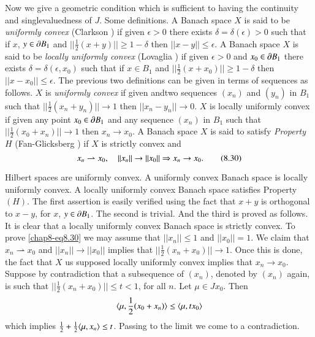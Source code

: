 \begin{remark*}
Now we give a geometric condition which is sufficient to having the
continuity and singlevaluedness of $J$. Some definitions. A Banach
space $X$ is said to be {\em uniformly convex} (Clarkson \cite{key26})
if given $\epsilon>0$ there exists $\delta=\delta(\epsilon)>0$ such
that if $x$, $y\in \partial B_{1}$ and $||\frac{1}{2}(x+y)||\geq 1-\delta$
then $||x-y||\leq \epsilon$. A Banach space $X$ is said to be {\em
  locally uniformly convex} (Lovaglia \cite{key58}) if given
$\epsilon>0$ and $x_{0}\in\partial B_{1}$ there exists
$\delta=\delta(\epsilon,x_{0})$ such that if $x\in B_{1}$ and
$||\frac{1}{2}(x+x_{0})||\geq 1-\delta$ then $||x-x_{0}||\leq
\epsilon$. The previous two definitions can be given in terms of
sequences as follows. $X$ is {\em uniformly convex} if given
and\pageoriginale two sequences $(x_{n})$ and $(y_{n})$ in $B_{1}$
such that $||\frac{1}{2}(x_{n}+y_{n})||\to 1$ then $||x_{n}-y_{n}||\to
0$. $X$ is locally uniformly convex if given any point $x_{0}\in \partial
B_{1}$ and any sequence $(x_{n})$ in $B_{1}$ such that
$||\frac{1}{2}(x_{0}+x_{n})||\to 1$ then $x_{n}\to x_{0}$. A Banach
space $X$ is said to satisfy {\em Property} $H$ (Fan-Glicksberg
\cite{key40}) if $X$ is strictly convex and
\begin{equation*}
x_{n}\rightharpoonup x_{0},\quad ||x_{n}||\to ||x_{0}||\Rightarrow
x_{n}\to x_{0}.\tag{8.30}\label{chap8-eq8.30} 
\end{equation*}

Hilbert spaces are uniformly convex. A uniformly convex Banach space
is locally uniformly convex. A locally uniformly convex Banach space
satisfies Property $(H)$. The first assertion is easily verified using
the fact that $x+y$ is orthogonal to $x-y$, for $x$, $y\in \partial
B_{1}$. The second is trivial. And the third is proved as follows. It
is clear that a locally uniformly convex Banach space is strictly
convex. To prove \eqref{chap8-eq8.30} we may assume that
$||x_{n}||\leq 1$ and $||x_{0}||=1$. We claim that
$x_{n}\rightharpoonup x_{0}$ and $||x_{n}||\to ||x_{0}||$ implies that
$||\frac{1}{2}(x_{n}+x_{0})||\to 1$. Once this is done, the fact that
$X$ us supposed locally uniformly convex implies that $x_{n}\to
x_{0}$. Suppose by contradiction that a subsequence of $(x_{n})$,
denoted by $(x_{n})$ again, is such that
$||\frac{1}{2}(x_{n}+x_{0})||\leq t<1$, for all $n$. Let $\mu\in
Jx_{0}$. Then
$$
\langle \mu,\frac{1}{2}(x_{0}+x_{n})\rangle \leq \langle \mu,tx_{0}\rangle
$$
which implies $\frac{1}{2}+\frac{1}{2}\langle \mu ,x_{n}\rangle\leq
t$. Passing to the limit we come to a contradiction.
\end{remark*}


